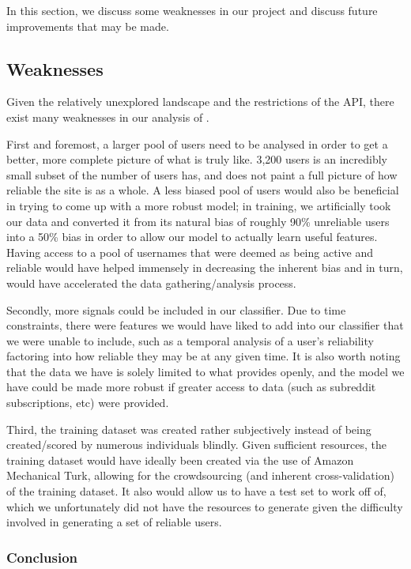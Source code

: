 In this section, we discuss some weaknesses in our project and discuss future
improvements that may be made.

\subsection{Weaknesses}
\label{sub:weaknesses}
Given the relatively unexplored landscape and the restrictions of the \reddit{}
API, there exist many weaknesses in our analysis of \reddit{}.

First and foremost, a larger pool of users need to be analysed in order to get a
better, more complete picture of what \reddit{} is truly like. 3,200 users is an
incredibly small subset of the number of users \reddit{} has, and does not paint
a full picture of how reliable the site is as a whole. A less biased pool of
users would also be beneficial in trying to come up with a more robust model; in
training, we artificially took our data and converted it from its natural bias
of roughly 90\% unreliable users into a 50\% bias in order to allow our model to
actually learn useful features. Having access to a pool of usernames that were
deemed as being active and reliable would have helped immensely in decreasing
the inherent bias and in turn, would have accelerated the data
gathering/analysis process.

Secondly, more signals could be included in our classifier. Due to time
constraints, there were features we would have liked to add into our classifier
that we were unable to include, such as a temporal analysis of a user's
reliability factoring into how reliable they may be at any given time. It is
also worth noting that the data we have is solely limited to what \reddit{}
provides openly, and the model we have could be made more robust if greater
access to data (such as subreddit subscriptions, etc) were provided.

Third, the training dataset was created rather subjectively instead of being
created/scored by numerous individuals blindly. Given sufficient resources, the
training dataset would have ideally been created via the use of Amazon
Mechanical Turk, allowing for the crowdsourcing (and inherent cross-validation)
of the training dataset. It also would allow us to have a test set to work off
of, which we unfortunately did not have the resources to generate given the
difficulty involved in generating a set of reliable users.

\subsubsection{Conclusion}

